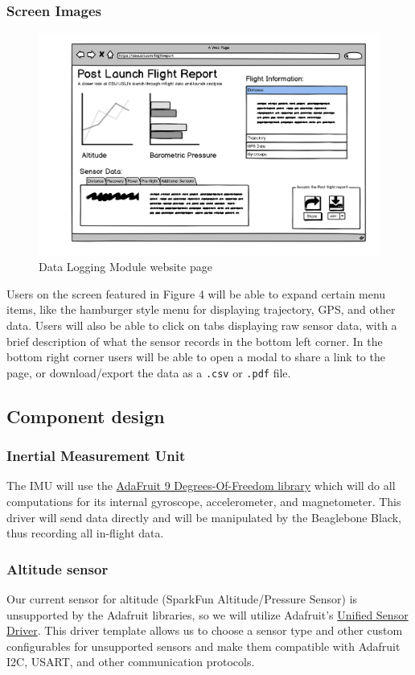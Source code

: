 \documentclass[onecolumn, draftclsnofoot,10pt, compsoc]{IEEEtran}
\def\code#1{\texttt{#1}}
\begin{document}
\subsubsection{Screen Images}
\begin{figure}[h]
	\begin{center}
		\caption{Data Logging Module website page}
		\includegraphics[width=\textwidth]{DLMGroundStationWireframe}
	\end{center}
\end{figure}
Users on the screen featured in Figure 4 will be able to expand certain menu items, like the hamburger style menu for displaying trajectory, GPS, and other data. Users will also be able to click on tabs displaying raw sensor data, with a brief description of what the sensor records in the bottom left corner. In the bottom right corner users will be able to open a modal to share a link to the page, or download/export the data as a \code{.csv} or \code{.pdf} file.

\subsection{Component design}
\subsubsection{Inertial Measurement Unit}
The IMU will use the \href{https://github.com/adafruit/Adafruit_9DOF}{AdaFruit 9 Degrees-Of-Freedom library} which will do all computations for its internal gyroscope, accelerometer, and magnetometer. This driver will send data directly and will be manipulated by the Beaglebone Black, thus recording all in-flight data.
\subsubsection{Altitude sensor}
Our current sensor for altitude (SparkFun Altitude/Pressure Sensor) is unsupported by the Adafruit libraries, so we will utilize Adafruit's \href{https://github.com/adafruit/Adafruit_Sensor}{Unified Sensor Driver}. This driver template allows us to choose a sensor type and other custom configurables for unsupported sensors and make them compatible with Adafruit I2C, USART, and other communication protocols. 
\end{document}
